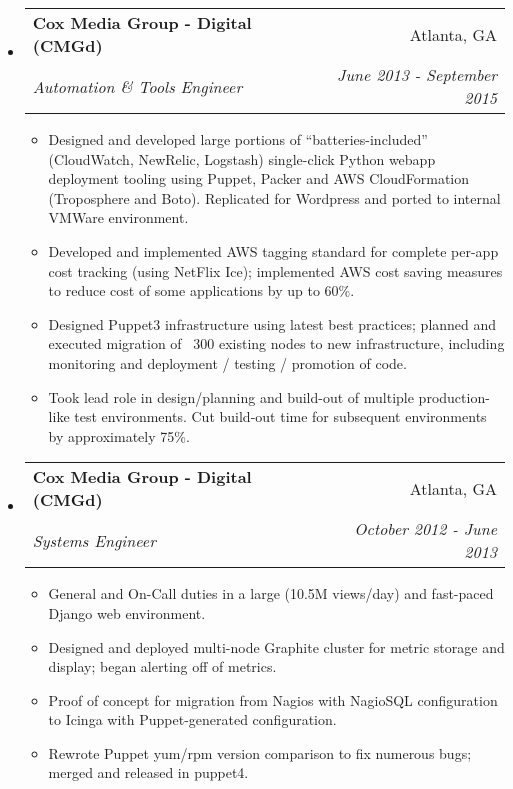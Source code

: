 \documentclass[letterpaper,11pt]{article}
\makeatletter
\newcommand{\resitem}[1]{\item #1 \vspace{-2pt}}
\newcommand{\ressubheading}[4]{
\begin{tabular*}{7.0in}{l@{\extracolsep{\fill}}r}
		\textbf{#1} & #2 \\
		\textit{#3} & \textit{#4} \\
\end{tabular*}\vspace{-6pt}}
\makeatother
\begin{document}
\begin{itemize}
\begin{itemize}
	\end{itemize}
\item
	\ressubheading{Cox Media Group - Digital (CMGd)}{Atlanta, GA}{Automation \& Tools Engineer}{June 2013 - September 2015}
	\begin{itemize}
                \resitem{Designed and developed large portions of ``batteries-included'' (CloudWatch, NewRelic, Logstash) single-click Python webapp deployment tooling using Puppet, Packer and AWS CloudFormation (Troposphere and Boto). Replicated for Wordpress and ported to internal VMWare environment.}
                \resitem{Developed and implemented AWS tagging standard for complete per-app cost tracking (using NetFlix Ice); implemented AWS cost saving measures to reduce cost of some applications by up to 60\%.}
                \resitem{Designed Puppet3 infrastructure using latest best practices; planned and executed migration of ~300 existing nodes to new infrastructure, including monitoring and deployment / testing / promotion of code.}
                \resitem{Took lead role in design/planning and build-out of multiple production-like test environments. Cut build-out time for subsequent environments by approximately 75\%.}
	\end{itemize}

\item
	\ressubheading{Cox Media Group - Digital (CMGd)}{Atlanta, GA}{Systems Engineer}{October 2012 - June 2013}
	\begin{itemize}
                \resitem{General and On-Call duties in a large (10.5M views/day) and fast-paced Django web environment.}
                \resitem{Designed and deployed multi-node Graphite cluster for metric storage and display; began alerting off of metrics.}
                \resitem{Proof of concept for migration from Nagios with NagioSQL configuration to Icinga with Puppet-generated configuration.}
                \resitem{Rewrote Puppet yum/rpm version comparison to fix numerous bugs; merged and released in puppet4.}
	\end{itemize}


\end{itemize}
\end{document}
